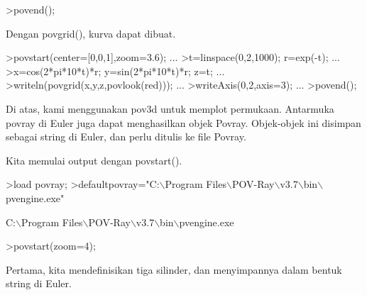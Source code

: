 \documentclass[a4paper,10pt]{article}
\begin{document}
\begin{eulernotebook}
\begin{eulercomment}
\begin{eulercomment}
\begin{eulercomment}
\begin{eulercomment}
\begin{eulercomment}
\begin{eulercomment}
\begin{eulercomment}
\begin{eulercomment}
\begin{eulercomment}
\begin{eulercomment}
\begin{eulercomment}
\begin{eulercomment}
\begin{eulercomment}
\begin{eulercomment}
\begin{eulercomment}
\begin{eulercomment}
\begin{eulerprompt}
>povend();
\end{eulerprompt}
\begin{eulercomment}
Dengan povgrid(), kurva dapat dibuat.
\end{eulercomment}
\begin{eulerprompt}
>povstart(center=[0,0,1],zoom=3.6); ...
>t=linspace(0,2,1000); r=exp(-t); ...
>x=cos(2*pi*10*t)*r; y=sin(2*pi*10*t)*r; z=t; ...
>writeln(povgrid(x,y,z,povlook(red))); ...
>writeAxis(0,2,axis=3); ...
>povend();
\end{eulerprompt}
\begin{eulercomment}
Di atas, kami menggunakan pov3d untuk memplot permukaan. Antarmuka
povray di Euler juga dapat menghasilkan objek Povray. Objek-objek ini
disimpan sebagai string di Euler, dan perlu ditulis ke file Povray.

Kita memulai output dengan povstart().
\end{eulercomment}
\begin{eulerprompt}
>load povray;
>defaultpovray="C:\(\backslash\)Program Files\(\backslash\)POV-Ray\(\backslash\)v3.7\(\backslash\)bin\(\backslash\)pvengine.exe"
\end{eulerprompt}
\begin{euleroutput}
  C:\(\backslash\)Program Files\(\backslash\)POV-Ray\(\backslash\)v3.7\(\backslash\)bin\(\backslash\)pvengine.exe
\end{euleroutput}
\begin{eulerprompt}
>povstart(zoom=4);
\end{eulerprompt}
\begin{eulercomment}
Pertama, kita mendefinisikan tiga silinder, dan menyimpannya dalam
bentuk string di Euler.


\end{eulercomment}
\end{eulercomment}
\end{eulercomment}
\end{eulercomment}
\end{eulercomment}
\end{eulercomment}
\end{eulercomment}
\end{eulercomment}
\end{eulercomment}
\end{eulercomment}
\end{eulercomment}
\end{eulercomment}
\end{eulercomment}
\end{eulercomment}
\end{eulercomment}
\end{eulercomment}
\end{eulercomment}
\end{eulernotebook}
\end{document}
